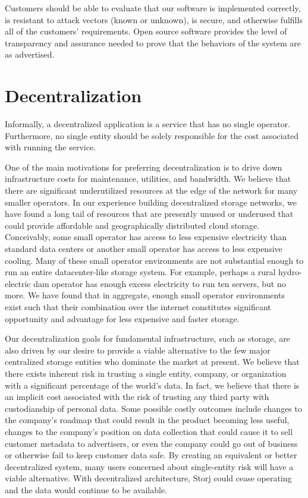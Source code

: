 \documentclass[8pt,fleqn,openany]{book}
\begin{document}
Customers should be able to
evaluate that our software is implemented correctly, is resistant to
attack vectors (known or unknown), is secure, and otherwise fulfills all
of the customers' requirements.
Open source software
provides the level of transparency and assurance needed to prove that the
behaviors of the system are as advertised.

\section{Decentralization}

Informally, a decentralized application is a service that has no single
operator. Furthermore, no single entity should be solely responsible for the
cost associated with running the service.

One of the main motivations for preferring decentralization is to drive
down infrastructure costs for maintenance, utilities, and bandwidth.
We believe that there
are significant underutilized resources at the edge of the network
for many smaller operators. In our experience building decentralized
storage networks, we have found a long tail of resources that are presently
unused or underused that could provide affordable and
geographically distributed cloud storage. Conceivably, some small operator
has access to less expensive electricity than standard data centers or another small
operator has access to less expensive cooling. Many of these small operator
environments are not substantial enough to run an entire datacenter-like
storage system. For example, perhaps a rural hydro-electric dam operator has
enough excess electricity to run ten servers, but no more. We have found that
in aggregate, enough small operator environments exist such that their
combination over the internet constitutes
significant opportunity and advantage for less expensive and faster storage.

Our decentralization goals for fundamental infrastructure, such as storage, are also driven by our desire to provide a viable alternative to the few major
centralized storage entities who dominate the market at present.
We believe that there exists inherent risk in trusting a single entity,
company, or organization with a significant percentage of the world's data.
In fact, we believe that there is an implicit cost associated with the risk of
trusting any third party with custodianship of personal data.
Some possible costly outcomes include changes to the company's roadmap that could result in the product
becoming less useful, changes to the company's position on data collection that could
cause it to sell customer metadata to advertisers, or even the company could go
out of business or otherwise fail to keep customer data safe.
By creating an equivalent or better decentralized
system, many users concerned about single-entity risk will have a viable
alternative.
With decentralized architecture, Storj could cease operating and the data
would continue to be available.
\end{document}
